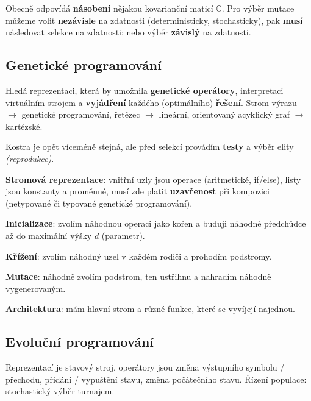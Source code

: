 \vspace{4pt}
\noindent Obecně odpovídá \textbf{násobení} nějakou kovarianční maticí $\mathbb{C}$. Pro výběr mutace můžeme volit \textbf{nezávisle} na zdatnosti (deterministicky, stochasticky), pak \textbf{musí} následovat selekce na zdatnosti; nebo výběr \textbf{závislý} na zdatnosti.

\subsection{Genetické programování}

Hledá reprezentaci, která by umožnila \textbf{genetické operátory}, interpretaci virtuálním strojem a \textbf{vyjádření} každého (optimálního) \textbf{řešení}. Strom výrazu $\to$ genetické programování, řetězec $\to$ lineární, orientovaný acyklický graf $\to$ kartézské.

\vspace{4pt}
\noindent Kostra je opět víceméně stejná, ale před selekcí provádím \textbf{testy} a výběr elity \textit{(reprodukce)}.

\vspace{4pt}
\noindent \textbf{Stromová reprezentace}: vnitřní uzly jsou operace (aritmetické, if/else), listy jsou konstanty a proměnné, musí zde platit \textbf{uzavřenost} při kompozici (netypované či typované genetické programování).

\vspace{4pt}
\noindent \textbf{Inicializace}: zvolím náhodnou operaci jako kořen a buduji náhodně předchůdce až do maximální výšky $d$ (parametr).

\vspace{4pt}
\noindent \textbf{Křížení}: zvolím náhodný uzel v každém rodiči a prohodím podstromy.

\vspace{4pt}
\noindent \textbf{Mutace}: náhodně zvolím podstrom, ten ustřihnu a nahradím náhodně vygenerovaným.

\vspace{4pt}
\noindent \textbf{Architektura}: mám hlavní strom a různé funkce, které se vyvíjejí najednou.

\subsection{Evoluční programování}

Reprezentací je stavový stroj, operátory jsou změna výstupního symbolu / přechodu, přidání / vypuštění stavu, změna počátečního stavu. Řízení populace: stochastický výběr turnajem.

